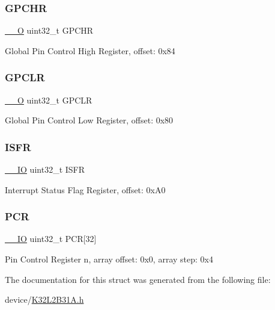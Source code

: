 \subsubsection{\texorpdfstring{GPCHR}{GPCHR}}
{\footnotesize\ttfamily \mbox{\hyperlink{core__cm0plus_8h_a7e25d9380f9ef903923964322e71f2f6}{\+\_\+\+\_\+O}} uint32\+\_\+t G\+P\+C\+HR}

Global Pin Control High Register, offset\+: 0x84 \mbox{\label{struct_p_o_r_t___type_a7ca65d71461aa5e76eb2266ab7ccd0cf}} 
\subsubsection{\texorpdfstring{GPCLR}{GPCLR}}
{\footnotesize\ttfamily \mbox{\hyperlink{core__cm0plus_8h_a7e25d9380f9ef903923964322e71f2f6}{\+\_\+\+\_\+O}} uint32\+\_\+t G\+P\+C\+LR}

Global Pin Control Low Register, offset\+: 0x80 \mbox{\label{struct_p_o_r_t___type_a810f6911c38333115775f924be784050}} 
\subsubsection{\texorpdfstring{ISFR}{ISFR}}
{\footnotesize\ttfamily \mbox{\hyperlink{core__cm0plus_8h_aec43007d9998a0a0e01faede4133d6be}{\+\_\+\+\_\+\+IO}} uint32\+\_\+t I\+S\+FR}

Interrupt Status Flag Register, offset\+: 0x\+A0 \mbox{\label{struct_p_o_r_t___type_a25bc9eea888d201d852deb4819850bb2}} 
\subsubsection{\texorpdfstring{PCR}{PCR}}
{\footnotesize\ttfamily \mbox{\hyperlink{core__cm0plus_8h_aec43007d9998a0a0e01faede4133d6be}{\+\_\+\+\_\+\+IO}} uint32\+\_\+t P\+CR\mbox{[}32\mbox{]}}

Pin Control Register n, array offset\+: 0x0, array step\+: 0x4 

The documentation for this struct was generated from the following file\+:\begin{DoxyCompactItemize}
\item 
device/\mbox{\hyperlink{_k32_l2_b31_a_8h}{K32\+L2\+B31\+A.\+h}}\end{DoxyCompactItemize}

